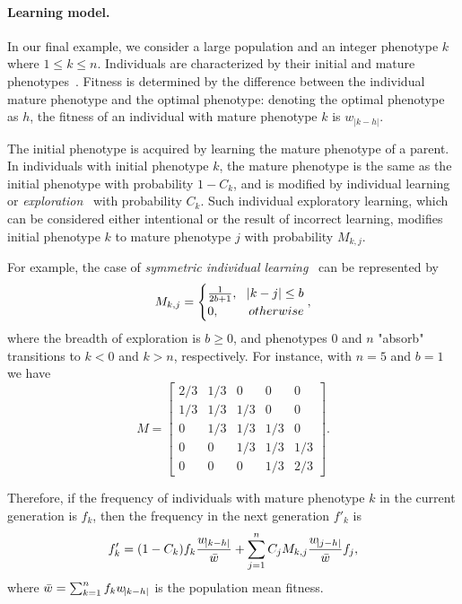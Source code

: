 \documentclass[9pt, a4paper, twocolumn]{extarticle}
\begin{document}
\paragraph*{Learning model.}\label{sec:learn_model}

In our final example, we consider a large population and an integer phenotype $k$ where $1 \le k \le n$.
Individuals are characterized by their initial and mature phenotypes~\citep[pg.~94]{Boyd1985}.
Fitness is determined by the difference between the individual mature phenotype and the optimal phenotype:
denoting the optimal phenotype as $h$, the fitness of an individual with mature phenotype $k$ is $w_{|k-h|}$.

The initial phenotype is acquired by learning the mature phenotype of a parent.
In individuals with initial phenotype $k$, the mature phenotype is the same as the initial phenotype with probability $1-C_k$, and is modified by individual learning or \emph{exploration}~\citep{Borenstein2008} with probability $C_k$.
Such individual exploratory learning, which can be considered either intentional or the result of incorrect learning, modifies initial phenotype $k$ to mature phenotype $j$ with probability $M_{k,j}$.

For example, the case of \emph{symmetric individual learning}~\citep{Borenstein2008} can be represented by
\begin{equation}
M_{k,j} = \begin{cases}
\frac{1}{2b+1}, & \abs{k-j} \le b \\
0, & otherwise
\end{cases},
\end{equation}
where the breadth of exploration is $b \ge 0$, and phenotypes $0$ and $n$ "absorb" transitions to $k<0$ and $k>n$, respectively. 
For instance, with $n=5$ and $b=1$ we have
\begin{equation}
M = \begin{bmatrix}
2/3 & 1/3 & 0 & 0 & 0 \\
1/3 & 1/3 & 1/3 & 0 & 0 \\
0 & 1/3 & 1/3 & 1/3 & 0 \\
0 & 0 & 1/3 & 1/3 & 1/3 \\
0 & 0 & 0 & 1/3 & 2/3
\end{bmatrix}.
\end{equation}
 
Therefore, if the frequency of individuals with mature phenotype $k$ in the current generation is $f_k$, then the frequency in the next generation $f'_k$ is
\begin{equation}
f'_k = (1-C_k) f_k \frac{w_{\abs{k-h}}}{\bar{w}} + \sum_{j=1}^{n}{C_j M_{k,j} \frac{w_{\abs{j-h}}}{\bar{w}} f_j },
\end{equation}
where $\bar{w} = \sum_{k=1}^{n}{f_k w_{\abs{k-h}}}$ is the population mean fitness.
\end{document}
